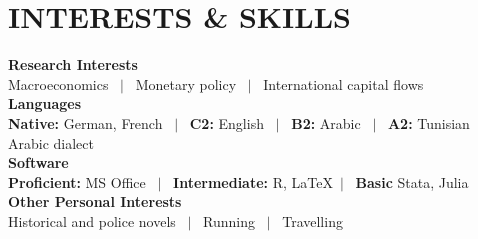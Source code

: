 \documentclass[a4paper,9pt]{extarticle}
\begin{document}

\section*{INTERESTS \& SKILLS}

\noindent
\newline
\textbf{Research Interests} \\
Macroeconomics \ $|$ \ Monetary policy \ $|$ \ International capital flows \\

\noindent
\textbf{Languages} \\
\textbf{Native:} German, French \ $|$ \ \textbf{C2:} English \ $|$ \ \textbf{B2:} Arabic \ $|$ \ \textbf{A2:} Tunisian Arabic dialect \\

\noindent
\textbf{Software} \\
\textbf{Proficient:} MS Office \ $|$ \ \textbf{Intermediate:} R, \LaTeX \ $|$ \ \textbf{Basic} Stata, Julia  \\

\noindent
\textbf{Other Personal Interests} \\
Historical and police novels \ $|$ \ Running \ $|$ \ Travelling  \\


\end{document}
